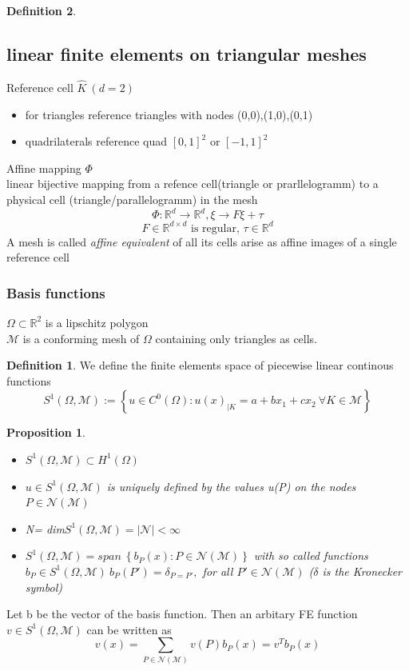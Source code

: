\documentclass[english]{article}
\newtheorem*{prop}{Proposition}
\theoremstyle{definition}
\newtheorem*{defi}{Definition}
\theoremstyle{remark}
\newcommand{\M}{\mathcal{M}}
\newcommand{\N}{\mathcal{N}}
\newcommand{\RR}{\mathbb{R}}			%
\newcommand{\dd}{\delta}				%
\newcommand{\OO}{\Omega}
\newcommand{\tx}[1]{\text{#1}}
\begin{document}
\begin{defi}
\begin{itemize}
\begin{enumerate}
      \end{enumerate}

    \end{itemize}
    \subsection{linear finite elements on triangular meshes}
    Reference cell $\hat K \ (d=2)$
    \begin{itemize}
    \item for triangles reference triangles with nodes (0,0),(1,0),(0,1)
    \item quadrilaterals reference quad $[0,1]^2$ or $[-1,1]^2$
    \end{itemize}
    Affine mapping $\Phi$\\
    linear bijective mapping from a refence cell(triangle or prarllelogramm) to a physical cell (triangle/parallelogramm) in the mesh $$\Phi : \RR^d \to \RR^d , \xi \to F \xi + \tau$$
    $$F \in \RR^{d\times d} \tx{ is regular, } \tau \in \RR^d$$
    A mesh is called \emph{affine equivalent} of all its cells arise as affine images of a single reference cell
    \subsubsection{Basis functions}
    $\OO\subset \RR^2$ is a lipschitz polygon\\
    $\M$ is a conforming mesh of $\OO$ containing only triangles as cells.
    \begin{defi} We define  the finite elements space of piecewise linear continous functions
      $$S^1 (\OO,\M) := \left\{u \in C^0 (\OO) : u(x)_{|K} = a+bx_1+cx_2 \ \forall K \in \M\right\}$$
    \end{defi}
    \begin{prop}
      \begin{itemize}
      \item $S^1 (\OO,\M) \subset H^1(\OO)$
      \item $u \in S^1(\OO,\M) $ is uniquely defined by the values u(P) on the nodes $P \in \N(\M)$
      \item N= dim$ S^1(\OO,\M) = |\N | <\infty$
      \item $S^1(\OO,\M) = span\ \left\{b_P(x) : P\in \N(\M) \right\} $ with so called functions $b_P \in S^1(\OO,\M) \ b_P(P') = \dd_{P=P'}, $ for all $P'\in \N(\M)$ ($\dd$ is the Kronecker symbol)
      \end{itemize}
    \end{prop}
    Let b be the vector of the basis function. Then an arbitary FE function $v \in  S^1(\OO,\M)$ can be written as 
    $$v(x) = \sum_{P \in \N(\M)} v(P) b_P(x) = v^T b_P(x)$$

\end{defi}
\end{document}
